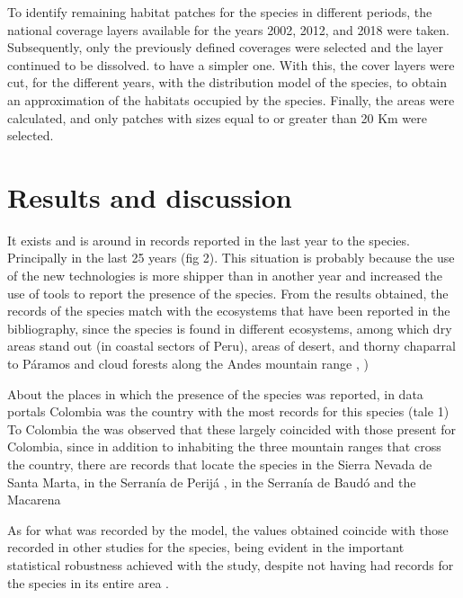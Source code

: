 \documentclass[preprint, 3p,
authoryear]{elsarticle} %
\begin{document}
To identify remaining habitat patches for the species in different
periods, the national coverage layers available for the years 2002,
2012, and 2018 were taken. Subsequently, only the previously defined
coverages were selected and the layer continued to be dissolved. to have
a simpler one. With this, the cover layers were cut, for the different
years, with the distribution model of the species, to obtain an
approximation of the habitats occupied by the species. Finally, the
areas were calculated, and only patches with sizes equal to or greater
than 20 Km were selected.

\hypertarget{results-and-discussion}{%
\section{Results and discussion}\label{results-and-discussion}}

It exists and is around in records reported in the last year to the
species. Principally in the last 25 years (fig 2). This situation is
probably because the use of the new technologies is more shipper than in
another year and increased the use of tools to report the presence of
the species. From the results obtained, the records of the species match
with the ecosystems that have been reported in the bibliography, since
the species is found in different ecosystems, among which dry areas
stand out (in coastal sectors of Peru), areas of desert, and thorny
chaparral to Páramos and cloud forests along the Andes mountain range
\citet{Kattan2004Range}, \citet{Garcia-Rangel2012Andean})

About the places in which the presence of the species was reported, in
data portals Colombia was the country with the most records for this
species (tale 1) To Colombia the was observed that these largely
coincided with those present for Colombia, since in addition to
inhabiting the three mountain ranges that cross the country, there are
records that locate the species in the Sierra Nevada de Santa Marta, in
the Serranía de Perijá \citet{Solari2013Riqueza} , in the Serranía de
Baudó and the Macarena \citep{Vela-Vargas2021Tremarctos}

As for what was recorded by the model, the values obtained coincide with
those recorded in other studies for the species, being evident in the
important statistical robustness achieved with the study, despite not
having had records for the species in its entire area
\citep{MezaMori2020Predictive}.
\end{document}
